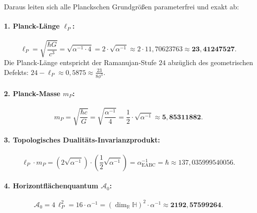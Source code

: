 \documentclass[11pt,a4paper]{article}
\begin{document}
Daraus leiten sich alle Planckschen Grundgrößen parameterfrei und exakt ab:

\paragraph{1. Planck-Länge $\ell_P$:}
\begin{equation}
\ell_P = \sqrt{\frac{\hbar G}{c^3}} = \sqrt{\alpha^{-1} \cdot 4} = 2 \cdot \sqrt{\alpha^{-1}} \approx 2 \cdot 11{,}70623763 \approx \mathbf{23{,}41247527}.
\end{equation}
Die Planck-Länge entspricht der Ramanujan-Stufe $24$ abzüglich des geometrischen Defekts: $24 - \ell_P \approx 0{,}5875 \approx \frac{23}{8\phi^3}$.

\paragraph{2. Planck-Masse $m_P$:}
\begin{equation}
m_P = \sqrt{\frac{\hbar c}{G}} = \sqrt{\frac{\alpha^{-1}}{4}} = \frac{1}{2} \cdot \sqrt{\alpha^{-1}} \approx \mathbf{5{,}85311882}.
\end{equation}

\paragraph{3. Topologisches Dualitäts-Invarianzprodukt:}
\begin{equation}
\ell_P \cdot m_P = \left(2\sqrt{\alpha^{-1}}\right) \cdot \left(\frac{1}{2}\sqrt{\alpha^{-1}}\right) = \alpha^{-1}_{\mathrm{EABC}} = \hbar \approx 137{,}035999540056.
\end{equation}

\paragraph{4. Horizontflächenquantum $\mathcal{A}_0$:}
\begin{equation}
\mathcal{A}_0 = 4\,\ell_P^2 = 16 \cdot \alpha^{-1} = (\dim_{\mathbb{R}}\mathbb{H})^2 \cdot \alpha^{-1} \approx \mathbf{2192{,}57599264}.
\end{equation}
\end{document}
